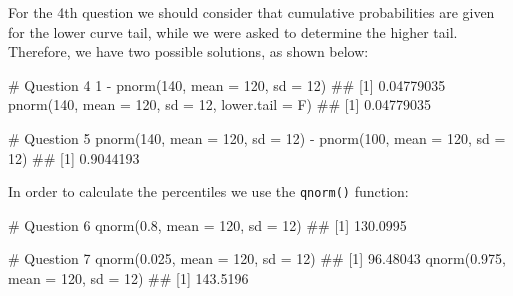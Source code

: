 \documentclass[a4paper,12pt,oneside]{book}
\newenvironment{Shaded}{\begin{snugshade}}{\end{snugshade}}
\newcommand{\DecValTok}[1]{#1}
\newcommand{\FloatTok}[1]{#1}
\newcommand{\SpecialCharTok}[1]{#1}
\newcommand{\CommentTok}[1]{#1}
\newcommand{\DocumentationTok}[1]{#1}
\newcommand{\FunctionTok}[1]{#1}
\newcommand{\AttributeTok}[1]{#1}
\newcommand{\NormalTok}[1]{#1}
\begin{document}
For the 4th question we should consider that cumulative probabilities are given for the lower curve tail, while we were asked to determine the higher tail. Therefore, we have two possible solutions, as shown below:

\begin{Shaded}
\begin{Highlighting}[]
\CommentTok{\# Question 4}
\DecValTok{1} \SpecialCharTok{{-}} \FunctionTok{pnorm}\NormalTok{(}\DecValTok{140}\NormalTok{, }\AttributeTok{mean =} \DecValTok{120}\NormalTok{, }\AttributeTok{sd =} \DecValTok{12}\NormalTok{)}
\DocumentationTok{\#\# [1] 0.04779035}
\FunctionTok{pnorm}\NormalTok{(}\DecValTok{140}\NormalTok{, }\AttributeTok{mean =} \DecValTok{120}\NormalTok{, }\AttributeTok{sd =} \DecValTok{12}\NormalTok{, }\AttributeTok{lower.tail =}\NormalTok{ F)}
\DocumentationTok{\#\# [1] 0.04779035}
\end{Highlighting}
\end{Shaded}

\begin{Shaded}
\begin{Highlighting}[]
\CommentTok{\# Question 5}
\FunctionTok{pnorm}\NormalTok{(}\DecValTok{140}\NormalTok{, }\AttributeTok{mean =} \DecValTok{120}\NormalTok{, }\AttributeTok{sd =} \DecValTok{12}\NormalTok{) }\SpecialCharTok{{-}} \FunctionTok{pnorm}\NormalTok{(}\DecValTok{100}\NormalTok{, }\AttributeTok{mean =} \DecValTok{120}\NormalTok{, }\AttributeTok{sd =} \DecValTok{12}\NormalTok{)}
\DocumentationTok{\#\# [1] 0.9044193}
\end{Highlighting}
\end{Shaded}

In order to calculate the percentiles we use the \texttt{qnorm()} function:

\begin{Shaded}
\begin{Highlighting}[]
\CommentTok{\# Question 6}
\FunctionTok{qnorm}\NormalTok{(}\FloatTok{0.8}\NormalTok{, }\AttributeTok{mean =} \DecValTok{120}\NormalTok{, }\AttributeTok{sd =} \DecValTok{12}\NormalTok{)}
\DocumentationTok{\#\# [1] 130.0995}
\end{Highlighting}
\end{Shaded}

\begin{Shaded}
\begin{Highlighting}[]
\CommentTok{\# Question 7}
\FunctionTok{qnorm}\NormalTok{(}\FloatTok{0.025}\NormalTok{, }\AttributeTok{mean =} \DecValTok{120}\NormalTok{, }\AttributeTok{sd =} \DecValTok{12}\NormalTok{)}
\DocumentationTok{\#\# [1] 96.48043}
\FunctionTok{qnorm}\NormalTok{(}\FloatTok{0.975}\NormalTok{, }\AttributeTok{mean =} \DecValTok{120}\NormalTok{, }\AttributeTok{sd =} \DecValTok{12}\NormalTok{)}
\DocumentationTok{\#\# [1] 143.5196}
\end{Highlighting}
\end{Shaded}
\end{document}
